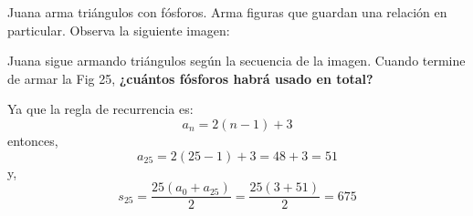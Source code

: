 Juana arma triángulos con fósforos. Arma figuras que guardan una relación en particular. Observa la siguiente imagen:

   
    Juana sigue armando triángulos según la secuencia de la imagen.
    Cuando termine de armar la Fig 25,
    \textbf{¿cuántos fósforos habrá usado en total?}\\

\begin{solutionbox}{4cm}
    Ya que la regla de recurrencia es:
    \[a_n=2(n-1)+3\]
    entonces,
    \[a_{25}=2(25-1)+3=48+3=51\]
    y,
    \[s_{25}=\dfrac{25(a_0+a_{25})}{2}=\dfrac{25(3+51)}{2}=675\]\end{solutionbox}
